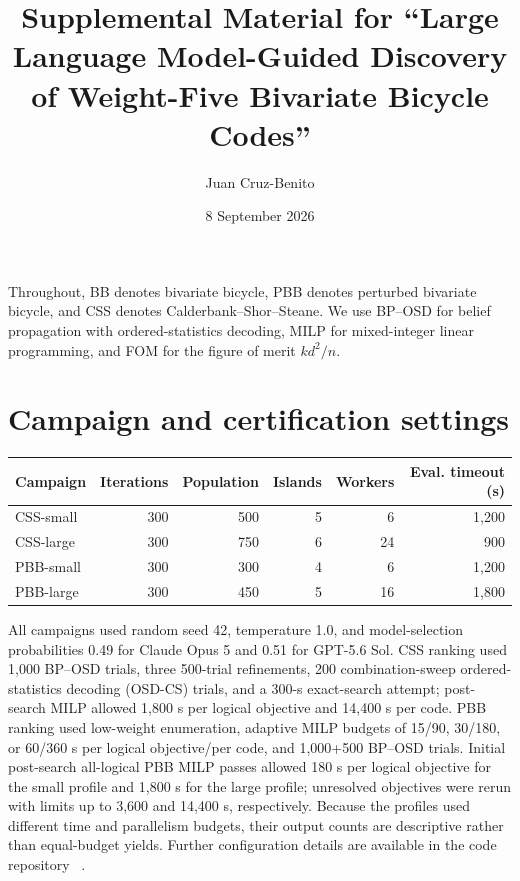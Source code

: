 \documentclass[aps,prx,onecolumn,superscriptaddress,nofootinbib]{revtex4-2}
\begin{document}
\raggedbottom

\title{Supplemental Material for ``Large Language Model-Guided Discovery of
Weight-Five Bivariate Bicycle Codes''}

\author{Juan Cruz-Benito}

\date{8 September 2026}

\maketitle

Throughout, BB denotes bivariate bicycle, PBB denotes perturbed bivariate
bicycle, and CSS denotes Calderbank--Shor--Steane.  We use BP--OSD for belief
propagation with ordered-statistics decoding, MILP for mixed-integer linear
programming, and FOM for the figure of merit $kd^2/n$.

\section*{Campaign and certification settings}

\begin{center}
\small
\begin{tabular}{lrrrrr}
\toprule
Campaign & Iterations & Population & Islands & Workers & Eval. timeout (s)\\
\midrule
CSS-small & 300 & 500 & 5 & 6 & 1,200\\
CSS-large & 300 & 750 & 6 & 24 & 900\\
PBB-small & 300 & 300 & 4 & 6 & 1,200\\
PBB-large & 300 & 450 & 5 & 16 & 1,800\\
\bottomrule
\end{tabular}
\end{center}

All campaigns used random seed 42, temperature 1.0, and model-selection
probabilities 0.49 for Claude Opus 5 and 0.51 for GPT-5.6 Sol.  CSS ranking
used 1,000 BP--OSD trials, three 500-trial refinements, 200 combination-sweep
ordered-statistics decoding (OSD-CS) trials, and a 300-s exact-search attempt;
post-search MILP allowed 1,800 s per logical objective and 14,400 s per code.
PBB ranking used low-weight enumeration, adaptive MILP budgets of 15/90,
30/180, or 60/360 s per logical objective/per code, and 1,000+500 BP--OSD
trials.  Initial post-search all-logical PBB MILP passes allowed 180 s per
logical objective for the small profile and 1,800 s for the large profile;
unresolved objectives were rerun with limits up to 3,600 and 14,400 s,
respectively.  Because the profiles used different time and parallelism
budgets, their output counts are descriptive rather than equal-budget yields.
Further configuration details are available in the code repository
~\cite{cruzbenito2026qcode}.





\end{document}
